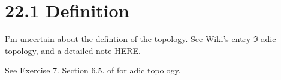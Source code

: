 \section{22.1 Definition}

I'm uncertain about the defintion of the topology. See Wiki's entry \href{https://en.wikipedia.org/wiki/I-adic_topology}{$\mathfrak I$-adic topology}, and a detailed note \href{https://math.gsu.edu/fenescu/commalglectures/8250Lect2.pdf}{HERE}.

See Exercise 7. Section 6.5. of \cite{bosch2013algebraic} for adic topology.